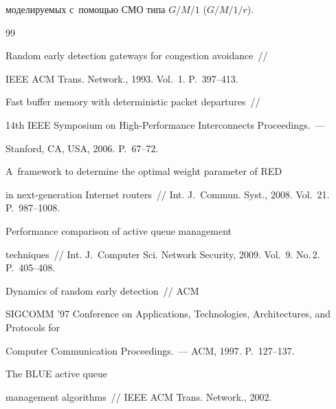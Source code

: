 моделируемых с~помощью СМО типа $G/M/1$ ($G/M/1/r$). 


  


{\small\frenchspacing


{%




\begin{thebibliography}{99}




 Random early detection gateways for congestion avoidance~/\!\!/ 


IEEE ACM Trans. Network., 1993. Vol.~1. P.~397--413.







 Fast buffer memory with deterministic packet departures~/\!\!/ 


14th IEEE Symposium on High-Performance Interconnects Proceedings.~---  


Stanford, CA, USA, 2006. P.~67--72. 




 A~framework to determine the optimal weight parameter of RED 


in next-generation Internet routers~/\!\!/ Int. J.~Commun. Syst., 2008. Vol.~21. P.~987--1008.




 Performance comparison of active queue management 


techniques~/\!\!/ Int. J.~Computer Sci. Network Security, 2009. Vol.~9. No.\,2. P.~405--408.




 Dynamics of random early detection~/\!\!/ ACM 


SIGCOMM '97 Conference on Applications, Technologies, Architectures, and Protocols for 


Computer Communication Proceedings.~---  ACM, 1997. P.~127--137. 






The BLUE active queue 


management algorithms~/\!\!/ IEEE ACM Trans. Network., 2002. 



\end{thebibliography}}}
